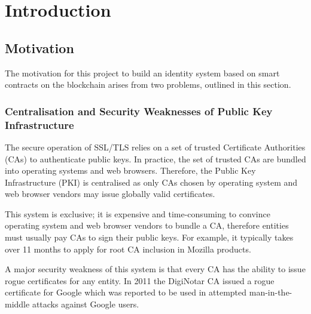 \documentclass[12pt]{report}
\newenvironment{originality}
	{\renewcommand{\abstractname}{Originality Avowal}
		\begin{abstract}}
	{\end{abstract}
		\clearpage}
\begin{document}
	\begin{originality}
		I verify that I am the sole author of this report, except for the content of this originality avowal and where explicitly stated to the contrary.
		
		I grant King's College London the right to make paper and electronic copies of the submitted work for purposes of marking, plagiarism detection and archival, and to upload a copy of the work to a trusted plagiarism detection service. I confirm this report does not exceed 25,000 words.
		
		\bigskip
		\noindent Mustafa Al-Bassam\newline
		\today
	\end{originality}
	
	\tableofcontents
	
	\chapter{Introduction}
	\section{Motivation}
	The motivation for this project to build an identity system based on smart contracts on the blockchain arises from two problems, outlined in this section.
	
	\subsection{Centralisation and Security Weaknesses of Public Key Infrastructure}
	The secure operation of SSL/TLS relies on a set of trusted Certificate Authorities (CAs) to authenticate public keys\cite{1}. In practice, the set of trusted CAs are bundled into operating systems and web browsers.\cite{27} Therefore, the Public Key Infrastructure (PKI) is centralised as only CAs chosen by operating system and web browser vendors may issue globally valid certificates.

	This system is exclusive; it is expensive and time-consuming to convince operating system and web browser vendors to bundle a CA, therefore entities must usually pay CAs to sign their public keys. For example, it typically takes over 11 months to apply for root CA inclusion in Mozilla products\cite{6}.
	 
	A major security weakness of this system is that every CA has the ability to issue rogue certificates for any entity. In 2011 the DigiNotar CA issued a rogue certificate for Google which was reported to be used in attempted man-in-the-middle attacks against Google users\cite{7}.
\end{document}
